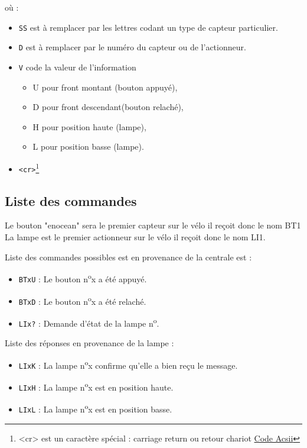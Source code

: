 \documentclass[a4paper, 10pt]{article} %
\newcommand{\numero}{n\textsuperscript{o}}
\begin{document}
où :
\begin{itemize}
  \item \verb|SS| est à remplacer par les lettres codant un type de capteur particulier.
  \item \verb|D| est à remplacer par le numéro du capteur ou de l'actionneur.
  \item \verb|V| code la valeur de l'information 
  \begin{itemize}
	\item  U pour front montant (bouton appuyé),
	\item  D pour front descendant(bouton relaché), 
	\item  H pour position haute (lampe), 
	\item  L pour position basse (lampe).  
  \end{itemize}
  \item \verb|<cr>|\footnote{<cr> est un caractère spécial : carriage return ou retour chariot \href{http://fr.wikipedia.org/wiki/American_Standard_Code_for_Information_Interchange}{Code Acsii}}
\end{itemize}

\subsection{Liste des commandes}
Le bouton "enocean" sera le premier capteur sur le vélo il reçoit donc le nom BT1
La lampe est le premier actionneur sur le vélo il reçoit donc le nom LI1.

Liste des commandes possibles est en provenance de la centrale est :
\begin{itemize}
	
\item 	\verb|BTxU| : Le bouton \numero x a été appuyé.
	
\item 	\verb|BTxD| : Le bouton \numero x a été relaché.

\item 	\verb|LIx?| : Demande d'état de la lampe \numero.
\end{itemize}

Liste des réponses en provenance de la lampe :
\begin{itemize}
\item 	\verb|LIxK| : La lampe \numero x confirme qu'elle a bien reçu le message.

\item 	\verb|LIxH| : La lampe \numero x est en position haute.

\item 	\verb|LIxL| : La lampe \numero x est en position basse.
\end{itemize}
\end{document}
